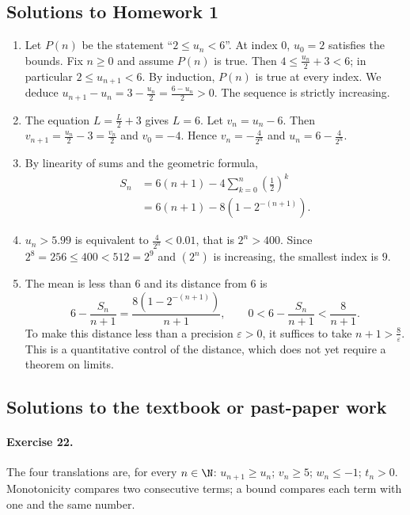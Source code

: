 \subsection{Solutions to Homework 1}\begin{enumerate}
\item Let $P(n)$ be the statement ``$2\le u_n<6$''. At index $0$, $u_0=2$ satisfies the bounds. Fix $n\ge0$ and assume $P(n)$ is true. Then $4\le \frac{u_n}{2}+3<6$; in particular $2\le u_{n+1}<6$. By induction, $P(n)$ is true at every index. We deduce $u_{n+1}-u_n=3-\frac{u_n}{2}=\frac{6-u_n}{2}>0$. The sequence is strictly increasing.
\item The equation $L=\frac{L}{2}+3$ gives $L=6$. Let $v_n=u_n-6$. Then $v_{n+1}=\frac{u_n}{2}-3=\frac{v_n}{2}$ and $v_0=-4$. Hence $v_n=-\frac{4}{2^n}$ and $u_n=6-\frac{4}{2^n}$.
\item By linearity of sums and the geometric formula,
\[\begin{aligned}S_n&=6(n+1)-4\sum_{k=0}^n(\frac{1}{2})^k\\&=6(n+1)-8(1-2^{-(n+1)}).\end{aligned}\]
\item $u_n>5.99$ is equivalent to $\frac{4}{2^n}<0.01$, that is $2^n>400$. Since $2^8=256\le400<512=2^9$ and $(2^n)$ is increasing, the smallest index is $9$.
\item The mean is less than $6$ and its distance from $6$ is
\[6-\frac{S_n}{n+1}=\frac{8(1-2^{-(n+1)})}{n+1},\qquad 0<6-\frac{S_n}{n+1}<\frac8{n+1}.\]
To make this distance less than a precision $\varepsilon>0$, it suffices to take $n+1>\frac{8}{\varepsilon}$. This is a quantitative control of the distance, which does not yet require a theorem on limits.
\end{enumerate}

\subsection{Solutions to the textbook or past-paper work}\paragraph{Exercise 22.} The four translations are, for every $n\in\N$: $u_{n+1}\ge u_n$; $v_n\ge5$; $w_n\le-1$; $t_n>0$. Monotonicity compares two consecutive terms; a bound compares each term with one and the same number.
